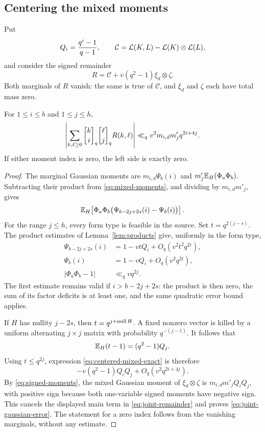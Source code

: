 \subsection{Centering the mixed moments}

Put
\[
 Q_i=\frac{q^i-1}{q-1},\qquad
 \mathcal C=\mathcal L(K,L)-\mathcal L(K)\otimes\mathcal L(L),
\]
and consider the signed remainder
\begin{equation}\label{eq:joint-remainder}
 R=\mathcal C+v(q^2-1)\xi_d\otimes\zeta.
\end{equation}
Both marginals of $R$ vanish: the same is true of $\mathcal C$, and
$\xi_d$ and $\zeta$ each have total mass zero.

\begin{lemma}\label{lem:joint-moment-error}
For $1\le i\le b$ and $1\le j\le h$,
\begin{equation}\label{eq:joint-gaussian-error}
 \left|\sum_{k,\ell\ge0}\qbin{k}{i}\qbin{\ell}{j}R(k,\ell)\right|
 \ll_q v^2m_{i,d}m'_j q^{2i+4j}.
\end{equation}
If either moment index is zero, the left side is exactly zero.
\end{lemma}

\begin{proof}
The marginal Gaussian moments are $m_{i,d}\Psi_b(i)$ and
$m'_j\mathbb E_H(\Phi_a\Phi_b)$. Subtracting their product from
\eqref{eq:mixed-moments}, and dividing by $m_{i,d}m'_j$, gives
\begin{equation}\label{eq:centered-mixed-exact}
 \mathbb E_H\!\left[
 \Phi_a\Phi_b\bigl(\Psi_{b-2j+2s}(i)-\Psi_b(i)\bigr)
 \right].
\end{equation}
For the range $j\le h$, every form type is feasible in the source.
Set $t=q^{2(j-s)}$. The product estimates of Lemma~\ref{lem:products}
give, uniformly in the form type,
\begin{align*}
 \Psi_{b-2j+2s}(i)&=1-vtQ_i+O_q(v^2t^2q^{2i}),\\
 \Psi_b(i)&=1-vQ_i+O_q(v^2q^{2i}),\\
 |\Phi_a\Phi_b-1|&\ll_q vq^{2j}.
\end{align*}
The first estimate remains valid if $i>b-2j+2s$: the product is then zero,
the sum of its factor deficits is at least one, and the same quadratic
error bound applies.

If $H$ has nullity $j-2s$, then $t=q^{j+\operatorname{null} H}$. A fixed nonzero vector
is killed by a uniform alternating $j\times j$ matrix with probability
$q^{-(j-1)}$. It follows that
\[
 \mathbb E_H(t-1)=(q^2-1)Q_j.
\]
Using $t\le q^{2j}$, expression \eqref{eq:centered-mixed-exact} is therefore
\[
 -v(q^2-1)Q_iQ_j+O_q(v^2q^{2i+4j}).
\]
By \eqref{eq:signed-moments}, the mixed Gaussian moment of
$\xi_d\otimes\zeta$ is $m_{i,d}m'_jQ_iQ_j$, with positive sign because
both one-variable signed moments have negative sign. This cancels the
displayed main term in \eqref{eq:joint-remainder} and proves
\eqref{eq:joint-gaussian-error}. The statement for a zero index follows
from the vanishing marginals, without any estimate.
\end{proof}

